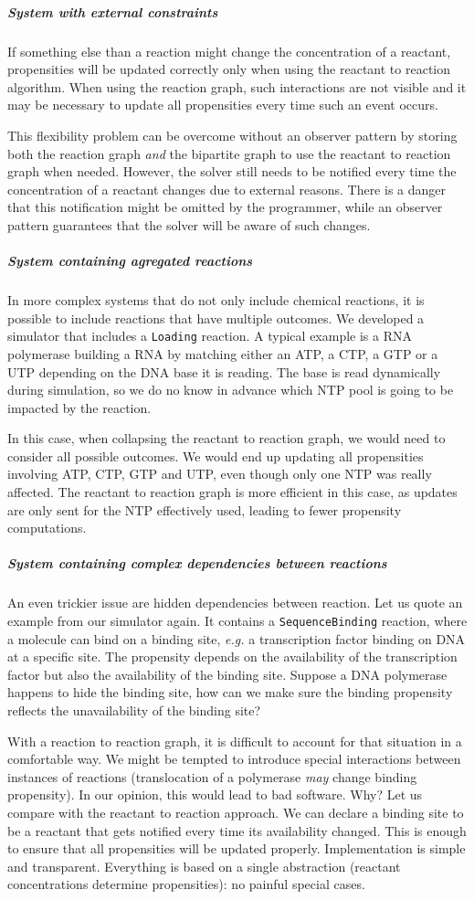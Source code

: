 \subparagraph{System with external constraints} If something else than a reaction might change the concentration of a reactant, propensities will be updated correctly only when using the reactant to reaction algorithm. When using the reaction graph, such interactions are not visible and it may be necessary to update all propensities every time such an event occurs.

This flexibility problem can be overcome without an observer pattern by storing both the reaction graph \emph{and} the bipartite graph to use the reactant to reaction graph when needed. However, the solver still needs to be notified every time the concentration of a reactant changes due to external reasons. There is a danger that this notification might be omitted by the programmer, while an observer pattern guarantees that the solver will be aware of such changes.

\subparagraph{System containing agregated reactions} In more complex systems that do not only include chemical reactions, it is possible to include reactions that have multiple outcomes. We developed a simulator that includes a \texttt{Loading} reaction. A typical example is a RNA polymerase building a RNA by matching either an ATP, a CTP, a GTP or a UTP depending on the DNA base it is reading. The base is read dynamically during simulation, so we do no know in advance which NTP pool is going to be impacted by the reaction.

In this case, when collapsing the reactant to reaction graph, we would need to consider all possible outcomes. We would end up updating all propensities involving ATP, CTP, GTP and UTP, even though only one NTP was really affected. The reactant to reaction graph is more efficient in this case, as updates are only sent for the NTP effectively used, leading to fewer propensity computations.

\subparagraph{System containing complex dependencies between reactions} An even trickier issue are hidden dependencies between reaction. Let us quote an example from our simulator again. It contains a \texttt{SequenceBinding} reaction, where a molecule can bind on a binding site, \textit{e.g.} a transcription factor binding on DNA at a specific site. The propensity depends on the availability of the transcription factor but also the availability of the binding site. Suppose a DNA polymerase happens to hide the binding site, how can we make sure the binding propensity reflects the unavailability of the binding site?

With a reaction to reaction graph, it is difficult to account for that situation in a comfortable way. We might be tempted to introduce special interactions between instances of reactions (translocation of a polymerase \emph{may} change binding propensity). In our opinion, this would lead to bad software. Why? Let us compare with the reactant to reaction approach. We can declare a binding site to be a reactant that gets notified every time its availability changed. This is enough to ensure that all propensities will be updated properly. Implementation is simple and transparent. Everything is based on a single abstraction (reactant concentrations determine propensities): no painful special cases.

